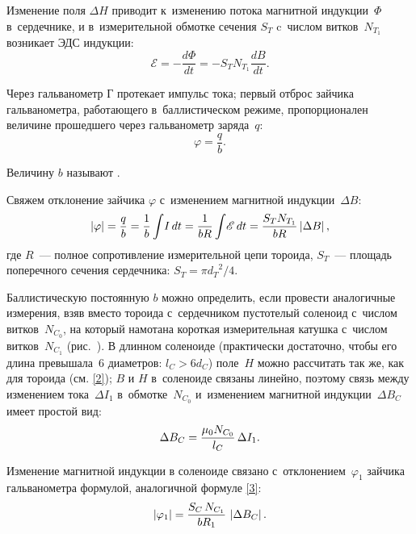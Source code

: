 Изменение поля $\Delta H$ приводит к~изменению потока магнитной индукции~$\Phi$ в~сердечнике, и в~измерительной обмотке
сечения $S_T$ c~числом витков~$N_{T_1}$ возникает ЭДС индукции:
\begin{equation*}
	\mathscr{E}=-\frac{d\Phi}{dt}=-S_T N_{T_1}\frac{dB}{dt}.
\end{equation*}

Через гальванометр Г протекает импульс тока; первый отброс зайчика гальванометра, работающего в~баллистическом режиме,
пропорционален величине прошедшего через гальванометр заряда~$q$:
\begin{equation*}
	\varphi=\frac{q}{b}.
\end{equation*}

Величину $b$ называют .

Свяжем отклонение зайчика $\varphi$ с~изменением магнитной индукции~$\Delta B$:
\begin{equation}
	\eqmark{3}
	|\varphi|=\frac{q}{b}=\frac{1}{b}\int\! I\,dt= \frac{1}{bR}\int\! \mathscr{E}\,dt=\frac{S_T N_{T_1}}{bR}\left| \Delta B \right|,
\end{equation}
где $R$~--- полное сопротивление измерительной цепи тороида, $S_T$~--- площадь поперечного сечения сердечника: $S_T=\pi
{d_T}^2/4$.

Баллистическую постоянную $b$ можно определить, если провести аналогичные измерения, взяв вместо тороида с~сердечником
пустотелый соленоид с~числом витков~$N_{C_0}$, на который намотана короткая измерительная катушка с~числом
витков~$N_{C_1}$ (рис.~). В длинном соленоиде (практически достаточно, чтобы его длина превышала~6 диаметров: $l_C >
6d_C$) поле~$H$ можно рассчитать так же, как для тороида (см. \eqref{2}); $B$ и $H$ в~соленоиде связаны линейно, поэтому
связь между изменением тока~$\Delta I_1$ в~обмотке~$N_{C_0}$ и~изменением магнитной индукции~$\Delta B_C$ имеет простой вид:
\begin{equation}%
	\eqmark{4}
	\Delta B_C=\frac{\mu_0 N_{C_0}}{l_C}\,\Delta I_1.
\end{equation}

Изменение магнитной индукции в соленоиде связано с~отклонением~$\varphi_1$ зайчика гальванометра формулой, аналогичной
формуле \eqref{3}:
\begin{equation}%
	\eqmark{5}
	\left| \varphi_1 \right|=\frac{S_C\,N_{C_1}}{bR_1}\,\left|\Delta B_C \right|.
\end{equation}

